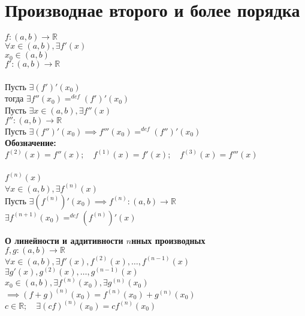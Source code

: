     
    \section{Производнае второго и более порядка}
    \begin{definition}
        $f: (a,b) \to \mathbb{R}$ \\
        $\forall x \in (a,b), \exists f'(x)$ \\
        $x_0 \in (a,b)$ \\
        $f': (a,b) \to \mathbb{R}$ \\
        \\
        Пусть $\exists (f')'(x_0)$ \\
        тогда $\exists f''(x_0)=^{def}(f')'(x_0)$ \\
        Пусть $\exists x \in (a,b), \exists f''(x)$ \\
        $f'' : (a,b) \to \mathbb{R}$ \\
        Пусть $\exists (f'')'(x_0) \implies f'''(x_0)=^{def}(f'')'(x_0)$\\
        \textbf{Обозначение:} $f^{(2)}(x)=f''(x); \quad f^{(1)}(x)=f'(x); \quad f^{(3)}(x)=f'''(x)$ \\
        \\
        $f^{(n)}(x)$ \\
        $\forall x \in (a,b), \exists f^{(n)}(x)$ \\
        Пусть $\exists (f^{(n)})'(x_0) \implies f^{(n)}: (a,b) \to \mathbb{R}$ \\
        $\exists f^{(n+1)}(x_0)=^{def}(f^{(n)})'(x)$
    \end{definition}
    \begin{theorem}
        \textbf{О линейности и аддитивности $n$нных производных}\\
        $f,g: (a,b) \to \mathbb{R}$ \\
        $\forall x \in (a,b), \exists f'(x), f^{(2)}(x), \ldots, f^{(n-1)}(x)$ \\
        $\exists g'(x), g^{(2)}(x),\ldots,g^{(n-1)}(x)$ \\
        $x_0\in (a,b), \exists f^{(n)}(x_0), \exists g^{(n)}(x_0)$ \\
        $\implies (f+g)^{(n)}(x_0)=f^{(n)}(x_0)+g^{(n)}(x_0)$\\
        $c \in \mathbb{R}; \quad \exists (cf)^{(n)}(x_0)=cf^{(n)}(x_0)$
    \end{theorem}
